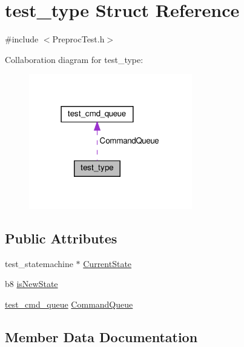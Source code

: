 \hypertarget{structtest__type}{}\section{test\+\_\+type Struct Reference}
\label{structtest__type}


{\ttfamily \#include $<$Preproc\+Test.\+h$>$}



Collaboration diagram for test\+\_\+type\+:
\nopagebreak
\begin{figure}[H]
\begin{center}
\leavevmode
\includegraphics[width=202pt]{d5/dfe/structtest__type__coll__graph}
\end{center}
\end{figure}
\subsection*{Public Attributes}
\begin{DoxyCompactItemize}
\item 
test\+\_\+statemachine $\ast$ \hyperlink{structtest__type_a48139457e16e23a57531e5af02be7f14}{Current\+State}
\item 
b8 \hyperlink{structtest__type_a36eb3041ef1341aec27a2a2d98500ce6}{is\+New\+State}
\item 
\hyperlink{structtest__cmd__queue}{test\+\_\+cmd\+\_\+queue} \hyperlink{structtest__type_a9ef32b05c6f8a712062f8261d71665ca}{Command\+Queue}
\end{DoxyCompactItemize}


\subsection{Member Data Documentation}
\mbox{\label{structtest__type_a9ef32b05c6f8a712062f8261d71665ca}} 
